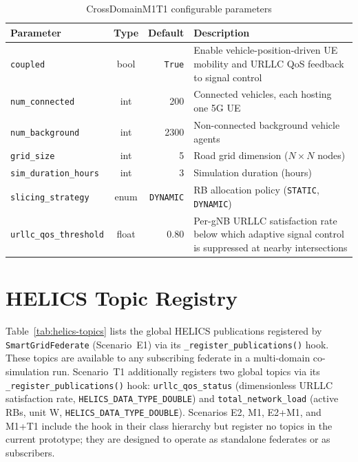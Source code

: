 \begin{table}[h]
    \centering
    \caption{CrossDomainM1T1 configurable parameters}
    \label{tab:params-m1t1}
    \small
    \begin{tabular}{|l|c|r|p{5.5cm}|}
        \hline
        \textbf{Parameter} & \textbf{Type} & \textbf{Default} & \textbf{Description} \\
        \hline
        \texttt{coupled}              & bool  & \texttt{True}     & Enable vehicle-position-driven UE mobility and URLLC QoS feedback to signal control \\
        \hline
        \texttt{num\_connected}      & int   & 200    & Connected vehicles, each hosting one 5G UE \\
        \hline
        \texttt{num\_background}     & int   & 2300   & Non-connected background vehicle agents \\
        \hline
        \texttt{grid\_size}          & int   & 5      & Road grid dimension ($N \times N$ nodes) \\
        \hline
        \texttt{sim\_duration\_hours} & int  & 3      & Simulation duration (hours) \\
        \hline
        \texttt{slicing\_strategy}   & enum  & \texttt{DYNAMIC} & RB allocation policy (\texttt{STATIC}, \texttt{DYNAMIC}) \\
        \hline
        \texttt{urllc\_qos\_threshold} & float & 0.80 & Per-gNB URLLC satisfaction rate below which adaptive signal control is suppressed at nearby intersections \\
        \hline
    \end{tabular}
\end{table}

\section{HELICS Topic Registry}
\label{sec:appendix-helics}

Table~\ref{tab:helics-topics} lists the global HELICS publications registered by \texttt{SmartGridFederate} (Scenario~E1) via its \texttt{\_register\_publications()} hook. These topics are available to any subscribing federate in a multi-domain co-simulation run. Scenario~T1 additionally registers two global topics via its \texttt{\_register\_publications()} hook: \texttt{urllc\_qos\_status} (dimensionless URLLC satisfaction rate, \texttt{HELICS\_DATA\_TYPE\_DOUBLE}) and \texttt{total\_network\_load} (active RBs, unit W, \texttt{HELICS\_DATA\_TYPE\_DOUBLE}). Scenarios E2, M1, E2+M1, and M1+T1 include the hook in their class hierarchy but register no topics in the current prototype; they are designed to operate as standalone federates or as subscribers.

